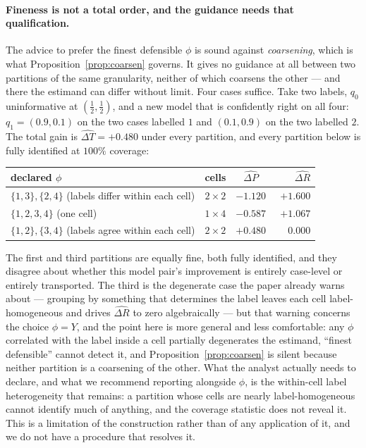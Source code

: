 \paragraph{Fineness is not a total order, and the guidance needs that qualification.}
The advice to prefer the finest defensible $\phi$ is sound against \emph{coarsening},
which is what Proposition~\ref{prop:coarsen} governs. It gives no guidance at all between
two partitions of the same granularity, neither of which coarsens the other --- and there
the estimand can differ without limit. Four cases suffice. Take two labels, $q_0$
uninformative at $(\tfrac12,\tfrac12)$, and a new model that is confidently right on all
four: $q_1=(0.9,0.1)$ on the two cases labelled $1$ and $(0.1,0.9)$ on the two labelled
$2$. The total gain is $\widehat{\Delta T}=+0.480$ under every partition, and every
partition below is fully identified at $100\%$ coverage:
\begin{center}
\begin{tabular}{@{}lccr@{}}
\toprule
declared $\phi$ & cells & $\widehat{\Delta P}$ & $\widehat{\Delta R}$ \\
\midrule
$\{1,3\},\{2,4\}$ (labels differ within each cell) & $2\times2$ & $-1.120$ & $+1.600$ \\
$\{1,2,3,4\}$ (one cell)                           & $1\times4$ & $-0.587$ & $+1.067$ \\
$\{1,2\},\{3,4\}$ (labels agree within each cell)  & $2\times2$ & $+0.480$ & $\phantom{+}0.000$ \\
\bottomrule
\end{tabular}
\end{center}
The first and third partitions are equally fine, both fully identified, and they disagree
about whether this model pair's improvement is entirely case-level or entirely
transported. The third is the degenerate case the paper already warns about --- grouping
by something that determines the label leaves each cell label-homogeneous and drives
$\widehat{\Delta R}$ to zero algebraically --- but that warning concerns the choice
$\phi=Y$, and the point here is more general and less comfortable: any $\phi$
correlated with the label inside a cell partially degenerates the estimand, ``finest
defensible'' cannot detect it, and Proposition~\ref{prop:coarsen} is silent because
neither partition is a coarsening of the other. What the analyst actually needs to
declare, and what we recommend reporting alongside $\phi$, is the within-cell label
heterogeneity that remains: a partition whose cells are nearly label-homogeneous cannot
identify much of anything, and the coverage statistic does not reveal it. This is a
limitation of the construction rather than of any application of it, and we do not have a
procedure that resolves it.

